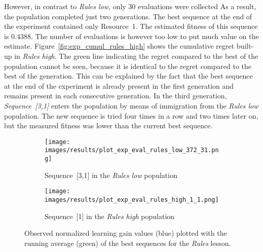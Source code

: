 However, in contrast to \emph{Rules low}, only 30 evaluations were collected
As a result, the population completed just two generations. The best sequence at the
end of the experiment contained only Resource~1. The estimated fitness of this
sequence is 0.4388. The number of evaluations is however too low to put much
value on the estimate. Figure~\ref{fig:exp_cumul_rules_high} shows the
cumulative regret built-up in \emph{Rules high}. The green line indicating the
regret compared to the best of the population cannot be seen, because it is
identical to the regret compared to the best of the generation. This can be
explained by the fact that the best sequence at the end of the experiment is
already present in the first generation and remains present in each consecutive
generation. In the third generation, \emph{Sequence~[3,1]} enters the population
by means of immigration from the \emph{Rules low} population. The new sequence
is tried four times in a row and two times later on, but the measured fitness
was lower than the current best sequence.

\begin{figure}[ht]
	\begin{subfigure}{0.9\linewidth}
	\centering
	\texttt{[image: images/results/plot\_exp\_eval\_rules\_low\_372\_31.png]}
	\caption{Sequence~[3,1] in the \emph{Rules low} population}
	\label{fig:exp_eval_rules_low_372}
	\end{subfigure}
	\hfill
	\begin{subfigure}{0.9\linewidth}
	\centering
	\texttt{[image: images/results/plot\_exp\_eval\_rules\_high\_1\_1.png]}
	\caption{Sequence~[1] in the \emph{Rules high} population}
	\label{fig:exp_eval_rules_high_1}
	\end{subfigure}
	\caption[Evaluations of best sequences in Rules]{Observed normalized learning gain values (blue) plotted with the
		running average (green) of the best sequences for the \emph{Rules}
	lesson.}
	\label{fig:exp_eval_rules}
\end{figure}


